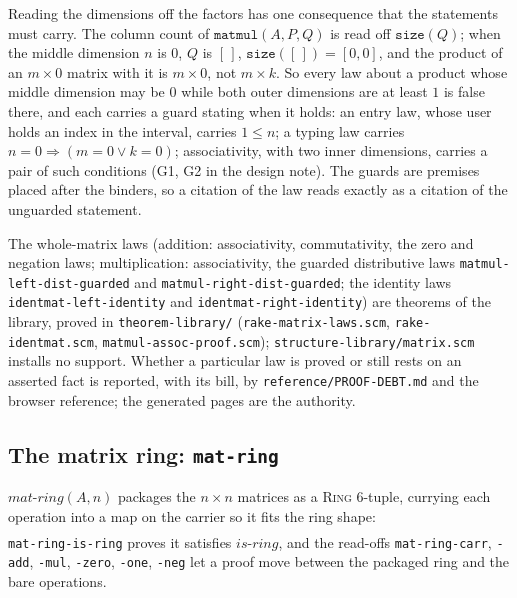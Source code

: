 Reading the dimensions off the factors has one consequence that the
statements must carry.  The column count of $\mathtt{matmul}(A,P,Q)$ is
read off $\mathtt{size}(Q)$; when the middle dimension $n$ is $0$, $Q$
is $[\,]$, $\mathtt{size}([\,]) = [0,0]$, and the product of an
$m \times 0$ matrix with it is $m \times 0$, not $m \times k$.  So every
law about a product whose middle dimension may be $0$ while both outer
dimensions are at least $1$ is false there, and each carries a guard
stating when it holds: an entry law, whose user holds an index in the
interval, carries $1 \le n$; a typing law carries
$n = 0 \Rightarrow (m = 0 \vee k = 0)$; associativity, with two inner
dimensions, carries a pair of such conditions (G1, G2 in the design
note).  The guards are premises placed after the binders, so a citation
of the law reads exactly as a citation of the unguarded statement.

The whole-matrix laws (addition: associativity, commutativity, the zero and
negation laws; multiplication: associativity, the guarded distributive laws
\texttt{matmul-left-dist-guarded} and \texttt{matmul-right-dist-guarded}; the
identity laws \texttt{identmat-left-identity} and \texttt{identmat-right-identity})
are theorems of the library, proved in \texttt{theorem-library/}
(\texttt{rake-matrix-laws.scm}, \texttt{rake-identmat.scm},
\texttt{matmul-assoc-proof.scm}); \texttt{structure-library/matrix.scm}
installs no support.  Whether a particular law is proved or still
rests on an asserted fact is reported, with its bill, by
\texttt{reference/PROOF-DEBT.md} and the browser reference; the generated
pages are the authority.

\subsection{The matrix ring: \texttt{mat-ring}}

$\mathit{mat\text{-}ring}(A, n)$ packages the $n \times n$ matrices as a
\textsc{Ring} 6-tuple, currying each operation into a map on the carrier
so it fits the ring shape:
\begin{align*}
  [\;&\mathtt{mat}(n,n,\mathtt{carr}(A)),\;
     \lambda P\,Q.\,\mathtt{matadd}(A,P,Q),\;
     \lambda P\,Q.\,\mathtt{matmul}(A,P,Q),\\
    &\lambda P.\,\mathtt{matneg}(A,P),\;
     \mathtt{zeromat}(A,n,n),\;
     \mathtt{identmat}(A,n)\;]
\end{align*}
\texttt{mat-ring-is-ring} proves it satisfies $\mathit{is\text{-}ring}$,
and the read-offs \texttt{mat-ring-carr}, \texttt{-add}, \texttt{-mul},
\texttt{-zero}, \texttt{-one}, \texttt{-neg} let a proof move between
the packaged ring and the bare operations.

